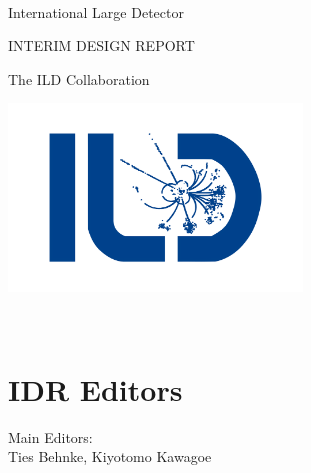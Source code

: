 %
%
\begin{titlepage}
\begin{center}
~
 ~\vskip 0.5cm

    {\huge  International} 
    {\huge  Large} 
    {\huge  Detector}
\vskip 3cm


\noindent\makebox[\linewidth]{\rule{\textwidth}{0.4pt}}

  \vskip 1.0cm

    {\huge INTERIM}
    {\huge DESIGN}
    {\huge REPORT}
\vskip 1cm
\noindent\makebox[\linewidth]{\rule{\textwidth}{0.4pt}}
\vskip 1.2cm




    

{\Large The ILD Collaboration}



\vskip 3cm
\end{center}
\begin{center}
\includegraphics[height=5cm]{ildlogo_Zh-mumuh_sharper_blueonwhite.png}
\end{center}

  \vfill\ 
    
\end{titlepage}

\newpage\thispagestyle{empty}
\cleardoublepage


\chapter*{IDR Editors}
\noindent Main Editors:\\
Ties Behnke, Kiyotomo Kawagoe

